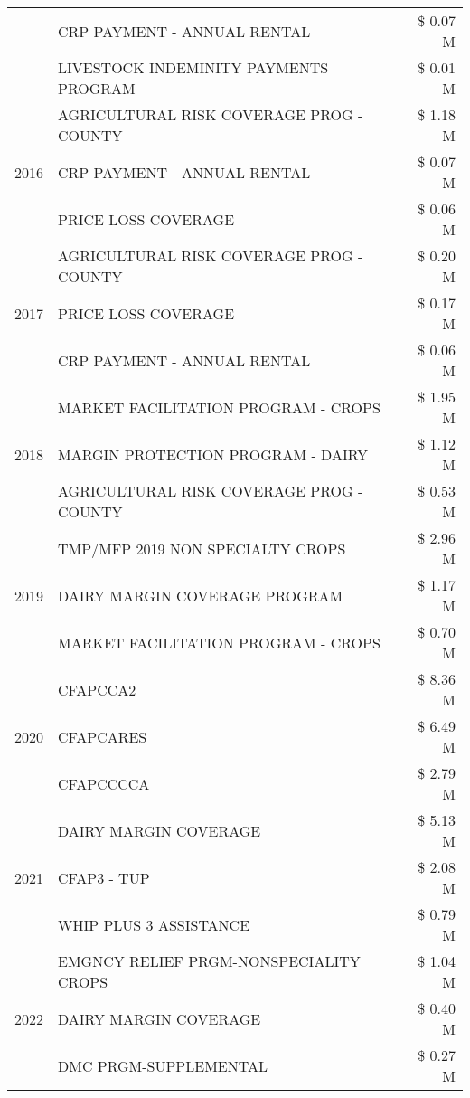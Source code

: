 \begin{tabular}{llr}
 & CRP PAYMENT - ANNUAL RENTAL & \$ 0.07 M \\
 & LIVESTOCK INDEMINITY PAYMENTS PROGRAM & \$ 0.01 M \\
\cline{1-3}
\multirow[t]{3}{*}{2016} & AGRICULTURAL RISK COVERAGE PROG - COUNTY & \$ 1.18 M \\
 & CRP PAYMENT - ANNUAL RENTAL & \$ 0.07 M \\
 & PRICE LOSS COVERAGE & \$ 0.06 M \\
\cline{1-3}
\multirow[t]{3}{*}{2017} & AGRICULTURAL RISK COVERAGE PROG - COUNTY & \$ 0.20 M \\
 & PRICE LOSS COVERAGE & \$ 0.17 M \\
 & CRP PAYMENT - ANNUAL RENTAL & \$ 0.06 M \\
\cline{1-3}
\multirow[t]{3}{*}{2018} & MARKET FACILITATION PROGRAM - CROPS & \$ 1.95 M \\
 & MARGIN PROTECTION PROGRAM - DAIRY & \$ 1.12 M \\
 & AGRICULTURAL RISK COVERAGE PROG - COUNTY & \$ 0.53 M \\
\cline{1-3}
\multirow[t]{3}{*}{2019} & TMP/MFP 2019 NON SPECIALTY CROPS & \$ 2.96 M \\
 & DAIRY MARGIN COVERAGE PROGRAM & \$ 1.17 M \\
 & MARKET FACILITATION PROGRAM - CROPS & \$ 0.70 M \\
\cline{1-3}
\multirow[t]{3}{*}{2020} & CFAPCCA2 & \$ 8.36 M \\
 & CFAPCARES & \$ 6.49 M \\
 & CFAPCCCCA & \$ 2.79 M \\
\cline{1-3}
\multirow[t]{3}{*}{2021} & DAIRY MARGIN COVERAGE & \$ 5.13 M \\
 & CFAP3 - TUP & \$ 2.08 M \\
 & WHIP PLUS 3 ASSISTANCE & \$ 0.79 M \\
\cline{1-3}
\multirow[t]{3}{*}{2022} & EMGNCY RELIEF PRGM-NONSPECIALITY CROPS & \$ 1.04 M \\
 & DAIRY MARGIN COVERAGE & \$ 0.40 M \\
 & DMC PRGM-SUPPLEMENTAL & \$ 0.27 M \\
\cline{1-3}
\bottomrule
\end{tabular}
